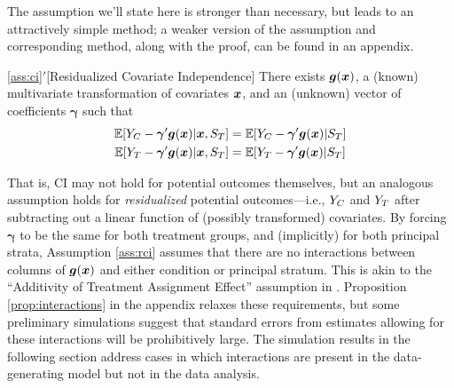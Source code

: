 \documentclass[]{article}
\begin{document}
The assumption we'll state here is stronger than necessary, but leads to an attractively simple method; a weaker version of the assumption and corresponding method, along with the proof, can be found in an appendix.

\begin{assp}{\ref*{ass:ci}$'$}[Residualized Covariate Independence]\label{ass:rci}
There exists $\bm{g}(\bm{x})$, a (known) multivariate transformation of covariates $\bm{x}$, and an (unknown) vector of coefficients $\bm{\gamma}$ such that
\begin{equation}\label{eq:ass:rci}
\begin{split}
\mathbb{E}[Y_C-\bm{\gamma}'\bm{g}(\bm{x})|\bm{x},S_T]&=\mathbb{E}[Y_C-\bm{\gamma}'\bm{g}(\bm{x})|S_T]\\
\mathbb{E}[Y_T-\bm{\gamma}'\bm{g}(\bm{x})|\bm{x},S_T]&=\mathbb{E}[Y_T-\bm{\gamma}'\bm{g}(\bm{x})|S_T]
\end{split}
\end{equation}
\end{assp}
That is, CI may not hold for potential outcomes themselves, but an analogous assumption holds for \emph{residualized} potential outcomes---i.e., $Y_C$ and $Y_T$ after subtracting out a linear function of (possibly transformed) covariates.
By forcing $\bm{\gamma}$ to be the same for both treatment groups, and (implicitly) for both principal strata, Assumption \ref{ass:rci} assumes that there are no interactions between columns of $\bm{g}(\bm{x})$ and either condition or principal stratum.
This is akin to the ``Additivity of Treatment Assignment Effect'' assumption in \citet{jo2002}.
Proposition \ref{prop:interactions} in the appendix relaxes these requirements, but some preliminary simulations suggest that standard errors from estimates allowing for these interactions will be prohibitively large.
The simulation results in the following section address cases in which interactions are present in the data-generating model but not in the data analysis.
\end{document}
